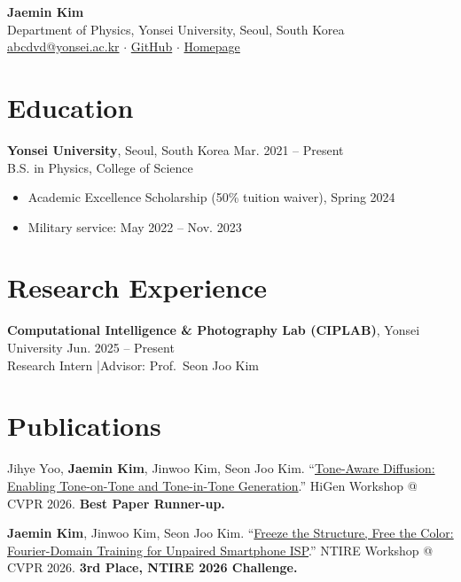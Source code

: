 \documentclass[a4paper,10pt]{article}
\begin{document}
\begin{center}
  {\LARGE \textbf{Jaemin Kim}} \\[4pt]
  Department of Physics, Yonsei University, Seoul, South Korea \\[2pt]
  \href{mailto:abcdvd@yonsei.ac.kr}{abcdvd@yonsei.ac.kr}
  \quad$\cdot$\quad
  \href{https://github.com/abcdvd}{GitHub}
  \quad$\cdot$\quad
  \href{https://abcdvd.github.io}{Homepage}
\end{center}

\section*{Education}
\textbf{Yonsei University}, Seoul, South Korea \hfill Mar. 2021 -- Present \\
B.S. in Physics, College of Science
\begin{itemize}
  \item Academic Excellence Scholarship (50\% tuition waiver), Spring 2024
  \item Military service: May 2022 -- Nov. 2023
\end{itemize}

\section*{Research Experience}
\textbf{Computational Intelligence \& Photography Lab (CIPLAB)}, Yonsei University \hfill Jun. 2025 -- Present \\
Research Intern \quad|\quad Advisor: Prof.\ Seon Joo Kim

\section*{Publications}
\begin{enumerate}[label={[\arabic*]}]
  \item Jihye Yoo, \textbf{Jaemin Kim}, Jinwoo Kim, Seon Joo Kim.
    ``\href{https://openaccess.thecvf.com/content/CVPR2026W/HiGen/papers/Yoo_Tone-Aware_Diffusion__Enabling_Tone-on-Tone_and_Tone-in-Tone_Generation_CVPRW_2026_paper.pdf}{Tone-Aware Diffusion: Enabling Tone-on-Tone and Tone-in-Tone Generation}.''
    HiGen Workshop @ CVPR 2026. \textbf{Best Paper Runner-up.}
  \item \textbf{Jaemin Kim}, Jinwoo Kim, Seon Joo Kim.
    ``\href{https://openaccess.thecvf.com/content/CVPR2026W/NTIRE/papers/Kim_Freeze_the_Structure_Free_the_Color_Fourier-Domain_Training_for_Unpaired_CVPRW_2026_paper.pdf}{Freeze the Structure, Free the Color: Fourier-Domain Training for Unpaired Smartphone ISP}.''
    NTIRE Workshop @ CVPR 2026. \textbf{3rd Place, NTIRE 2026 Challenge.}
\end{enumerate}
\end{document}
